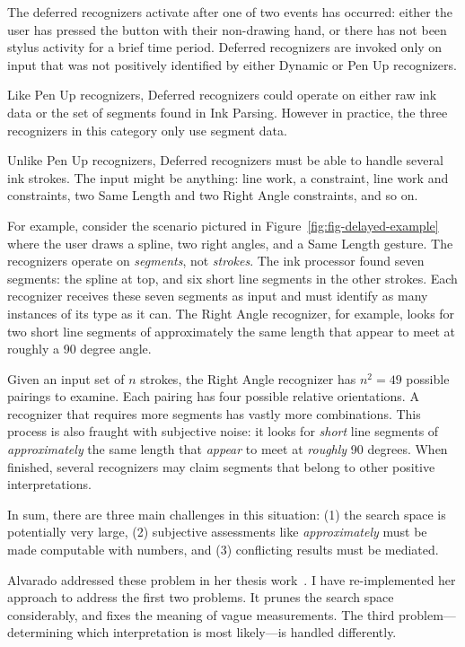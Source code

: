 The deferred recognizers activate after one of two events has occurred:
either the user has pressed the button with their non-drawing hand, or
there has not been stylus activity for a brief time period. Deferred
recognizers are invoked only on input that was not positively
identified by either Dynamic or Pen Up recognizers.

Like Pen Up recognizers, Deferred recognizers could operate on either
raw ink data or the set of segments found in Ink Parsing. However in
practice, the three recognizers in this category only use segment
data.

Unlike Pen Up recognizers, Deferred recognizers must be able to handle
several ink strokes. The input might be anything: line work, a
constraint, line work and constraints, two Same Length and two Right
Angle constraints, and so on. 



For example, consider the scenario pictured in
Figure~\ref{fig:fig-delayed-example} where the user draws a spline,
two right angles, and a Same Length gesture. The recognizers operate
on \textit{segments}, not \textit{strokes}. The ink processor found
seven segments: the spline at top, and six short line segments in the
other strokes. Each recognizer receives these seven segments as input
and must identify as many instances of its type as it can. The Right
Angle recognizer, for example, looks for two short line segments of
approximately the same length that appear to meet at roughly a 90
degree angle. 

Given an input set of $n$ strokes, the Right Angle recognizer has
$n^2=49$ possible pairings to examine. Each pairing has four possible
relative orientations. A recognizer that requires more segments has
vastly more combinations. This process is also fraught with subjective
noise: it looks for \textit{short} line segments of
\textit{approximately} the same length that \textit{appear} to meet at
\textit{roughly} 90 degrees. When finished, several recognizers may
claim segments that belong to other positive interpretations.

In sum, there are three main challenges in this situation: (1) the
search space is potentially very large, (2) subjective assessments
like \textit{approximately} must be made computable with numbers, and
(3) conflicting results must be mediated.

Alvarado addressed these problem in her thesis
work~\cite[Ch. 4]{alvarado-phd-thesis}. I have re-implemented her
approach to address the first two problems. It prunes the search space
considerably, and fixes the meaning of vague measurements. The third
problem---determining which interpretation is most likely---is handled
differently.


